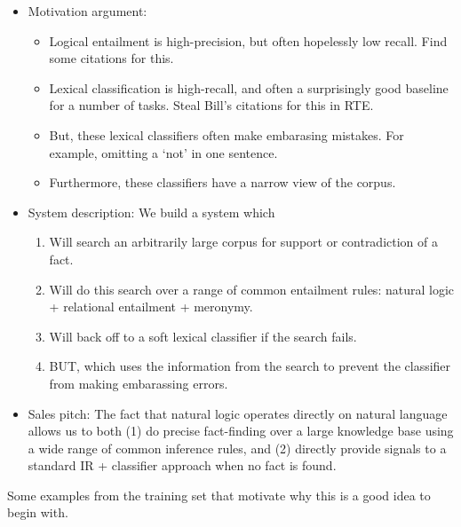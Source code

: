 \begin{itemize}

\item Motivation argument:
  \begin{itemize}
    \item Logical entailment is high-precision, but often hopelessly low recall.
          Find some citations for this.
    \item Lexical classification is high-recall, and often a surprisingly good baseline
          for a number of tasks.
          Steal Bill's citations for this in RTE.
    \item But, these lexical classifiers often make embarasing mistakes.
          For example, omitting a `not' in one sentence.
    \item Furthermore, these classifiers have a narrow view of the corpus.
  \end{itemize}

\item System description: We build a system which
  \begin{enumerate}
    \item Will search an arbitrarily large corpus for support or contradiction of
          a fact.
    \item Will do this search over a range of common entailment rules: natural
          logic + relational entailment + meronymy.
    \item Will back off to a soft lexical classifier if the search fails.
    \item BUT, which uses the information from the search to prevent the
          classifier from making embarassing errors.
  \end{enumerate}

\item Sales pitch:
  The fact that natural logic operates directly on natural language allows us
  to both (1) do precise fact-finding over a large knowledge base using a
  wide range of common inference rules, and (2) directly provide signals to
  a standard IR + classifier approach when no fact is found.
\end{itemize}

Some examples from the training set that motivate why this is a good idea to begin
with.

